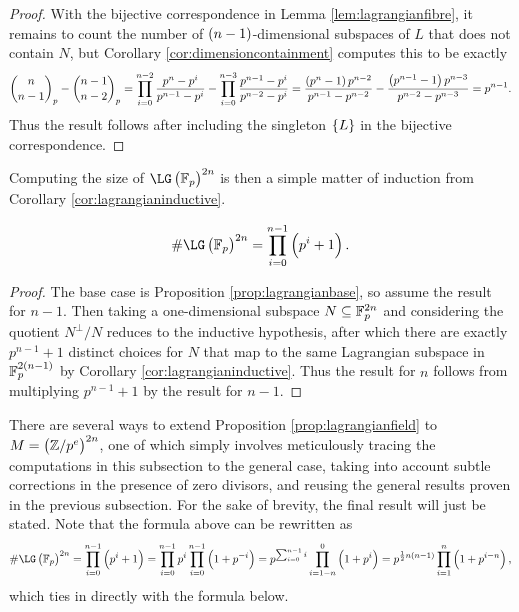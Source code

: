 \begin{proof}
With the bijective correspondence in Lemma \ref{lem:lagrangianfibre}, it remains to count the number of $ \br{n - 1} $-dimensional subspaces of $ L $ that does not contain $ N $, but Corollary \ref{cor:dimensioncontainment} computes this to be exactly
$$ \binom{n}{n - 1}_p - \binom{n - 1}{n - 2}_p = \prod_{i = 0}^{n - 2} \dfrac{p^n - p^i}{p^{n - 1} - p^i} - \prod_{i = 0}^{n - 3} \dfrac{p^{n - 1} - p^i}{p^{n - 2} - p^i} = \dfrac{\br{p^n - 1}p^{n - 2}}{p^{n - 1} - p^{n - 2}} - \dfrac{\br{p^{n - 1} - 1}p^{n - 3}}{p^{n - 2} - p^{n - 3}} = p^{n - 1}. $$
Thus the result follows after including the singleton $ \cbr{L} $ in the bijective correspondence.
\end{proof}

Computing the size of $ \LG\br{\FF_p}^{2n} $ is then a simple matter of induction from Corollary \ref{cor:lagrangianinductive}.

\begin{proposition}
\label{prop:lagrangianfield}
$$ \#\LG\br{\FF_p}^{2n} = \prod_{i = 0}^{n - 1} \br{p^i + 1}. $$
\end{proposition}

\begin{proof}
The base case is Proposition \ref{prop:lagrangianbase}, so assume the result for $ n - 1 $. Then taking a one-dimensional subspace $ N \subseteq \mathbb{F}_p^{2n} $ and considering the quotient $ N^\perp / N $ reduces to the inductive hypothesis, after which there are exactly $ p^{n - 1} + 1 $ distinct choices for $ N $ that map to the same Lagrangian subspace in $ \FF_p^{2\br{n - 1}} $ by Corollary \ref{cor:lagrangianinductive}. Thus the result for $ n $ follows from multiplying $ p^{n - 1} + 1 $ by the result for $ n - 1 $.
\end{proof}

There are several ways to extend Proposition \ref{prop:lagrangianfield} to $ M = \br{\ZZ / p^e}^{2n} $, one of which simply involves meticulously tracing the computations in this subsection to the general case, taking into account subtle corrections in the presence of zero divisors, and reusing the general results proven in the previous subsection. For the sake of brevity, the final result will just be stated. Note that the formula above can be rewritten as
$$ \#\LG\br{\FF_p}^{2n} = \prod_{i = 0}^{n - 1} \br{p^i + 1} = \prod_{i = 0}^{n - 1} p^i\prod_{i = 0}^{n - 1} \br{1 + p^{-i}} = p^{\sum_{i = 0}^{n - 1} i}\prod_{i = 1 - n}^0 \br{1 + p^i} = p^{\frac{1}{2}n\br{n - 1}}\prod_{i = 1}^n \br{1 + p^{i - n}}, $$
which ties in directly with the formula below.

